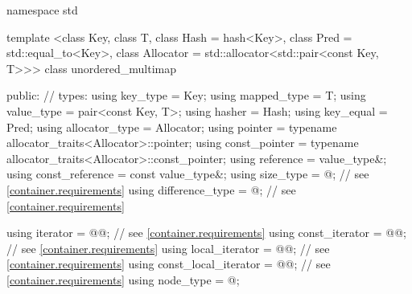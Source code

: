 %
\begin{codeblock}
namespace std {
  template <class Key,
            class T,
            class Hash = hash<Key>,
            class Pred = std::equal_to<Key>,
            class Allocator = std::allocator<std::pair<const Key, T>>>
  class unordered_multimap {
  public:
    // types:
    using key_type             = Key;
    using mapped_type          = T;
    using value_type           = pair<const Key, T>;
    using hasher               = Hash;
    using key_equal            = Pred;
    using allocator_type       = Allocator;
    using pointer              = typename allocator_traits<Allocator>::pointer;
    using const_pointer        = typename allocator_traits<Allocator>::const_pointer;
    using reference            = value_type&;
    using const_reference      = const value_type&;
    using size_type            = @\impdef@; // see \ref{container.requirements}
    using difference_type      = @\impdef@; // see \ref{container.requirements}

    using iterator             = @@; // see \ref{container.requirements}
    using const_iterator       = @@; // see \ref{container.requirements}
    using local_iterator       = @@; // see \ref{container.requirements}
    using const_local_iterator = @@; // see \ref{container.requirements}
    using node_type            = @\unspec@;

}}
\end{codeblock}
